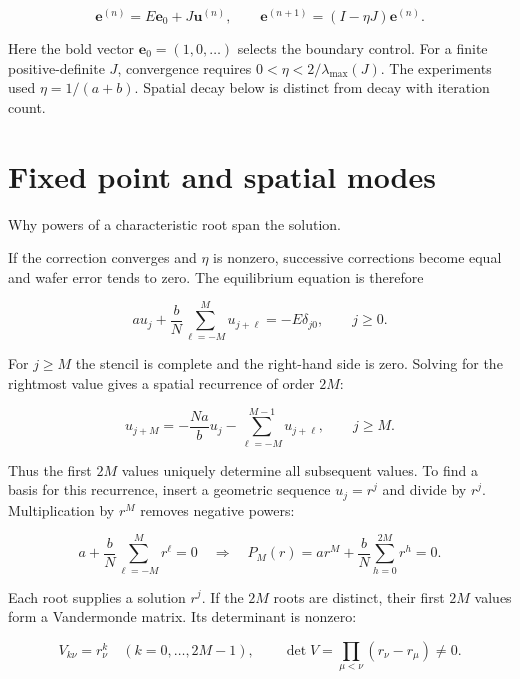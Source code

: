 \documentclass[10pt,a4paper]{article}
\newcommand{\subtitle}[1]{%
  {\small\color{muted}#1\par}\medskip}
\newcommand{\smallnote}[1]{%
  {\small #1\par}}
\begin{document}
\begin{equation}
\mathbf e^{(n)}
=
E\mathbf e_0+J\mathbf u^{(n)},
\qquad
\mathbf e^{(n+1)}
=
(I-\eta J)\mathbf e^{(n)}.
\end{equation}

\smallnote{
Here the bold vector $\mathbf e_0=(1,0,\ldots)$ selects
the boundary control.
For a finite positive-definite $J$, convergence requires
$0<\eta<2/\lambda_{\max}(J)$.
The experiments used $\eta=1/(a+b)$.
Spatial decay below is distinct from decay with
iteration count.
}

\clearpage
\section{Fixed point and spatial modes}
\subtitle{Why powers of a characteristic root span
the solution.}

If the correction converges and $\eta$ is nonzero,
successive corrections become equal and wafer error
tends to zero.
The equilibrium equation is therefore

\begin{equation}
a u_j
+
\frac{b}{N}
\sum_{\ell=-M}^{M}u_{j+\ell}
=
-E\delta_{j0},
\qquad j\geq 0.
\end{equation}

For $j\geq M$ the stencil is complete and the
right-hand side is zero.
Solving for the rightmost value gives a spatial
recurrence of order $2M$:

\begin{equation}
u_{j+M}
=
-\frac{Na}{b}u_j
-
\sum_{\ell=-M}^{M-1}u_{j+\ell},
\qquad j\geq M.
\end{equation}

Thus the first $2M$ values uniquely determine
all subsequent values.
To find a basis for this recurrence, insert a
geometric sequence $u_j=r^j$ and divide by $r^j$.
Multiplication by $r^M$ removes negative powers:

\begin{equation}
a+\frac{b}{N}\sum_{\ell=-M}^{M}r^\ell=0
\quad\Longrightarrow\quad
P_M(r)
=
a r^M+\frac{b}{N}\sum_{h=0}^{2M}r^h
=
0.
\end{equation}

Each root supplies a solution $r^j$.
If the $2M$ roots are distinct, their first $2M$
values form a Vandermonde matrix.
Its determinant is nonzero:

\begin{equation}
V_{k\nu}=r_\nu^k
\quad(k=0,\ldots,2M-1),
\qquad
\det V
=
\prod_{\mu<\nu}(r_\nu-r_\mu)
\neq 0.
\end{equation}
\end{document}
